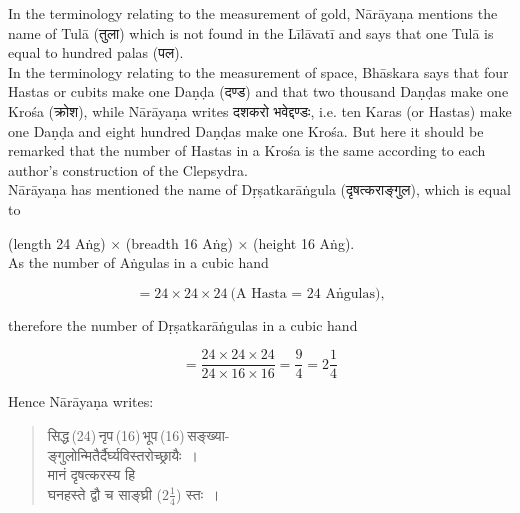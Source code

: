 \documentclass[11pt, openany]{book}
\begin{document}
\vspace{-2mm}
 In the terminology relating to the measurement of gold, 
Nārāyaṇa mentions the name of Tulā (तुला) which is not found 
in the Līlāvatī and says that one Tulā is equal to hundred 
palas (पल). \\

\vspace{-2mm}
 In the terminology relating to the measurement of space, 
Bhāskara says that four Hastas or cubits make one Daṇḍa (दण्ड) and that two thousand Daṇḍas make one Krośa (क्रोश),
while Nārāyaṇa writes {\qt दशकरो भवेद्दण्डः}, i.e. ten Karas (or 
Hastas) make one Daṇḍa and eight hundred Daṇḍas make 
one Krośa. But here it should be remarked that the number 
of Hastas in a Krośa is the same according to each author's 
construction of the Clepsydra. \\

 Nārāyaṇa has mentioned the name of Dṛṣatkarāṅgula 
(दृषत्कराङ्गुल), which is equal to\\
\vspace{-2mm}

\begin{sloppypar}
\indent \indent (length 24 Aṅg) $\times$ (breadth 16 Aṅg) $\times$ (height 16 Aṅg). \\
\indent \indent As the number of Aṅgulas in a cubic hand 
\vspace{-2mm}

 \begin{equation*}
      = 24 \times 24 \times 24\ \text{(A Hasta = 24 Aṅgulas),} 
 \end{equation*}

\indent therefore the number of Dṛṣatkarāṅgulas in a cubic hand 
\end{sloppypar}
\begin{equation*}
= \dfrac{24 \times 24 \times 24} {24 \times 16 \times 16} = \frac{9}{4} = 2\frac{1}{4}
\end{equation*}
 
\vspace{2mm}
 Hence Nārāyaṇa writes: 

\begin{quote}
{\color{violet}सिद्ध\textendash \,(24)\textendash \,नृप\textendash \,(16)\textendash \,भूप\textendash \,(16)\textendash \,सङ्ख्या- \\
 ङ्गुलोन्मितैर्दैर्घ्यविस्तरोच्छ्रायैः~। \\
 मानं दृषत्करस्य हि\\
 घनहस्ते द्वौ च साङ्घ्री ($2\frac{1}{4}$) स्तः~। }
\end{quote}
\end{document}
